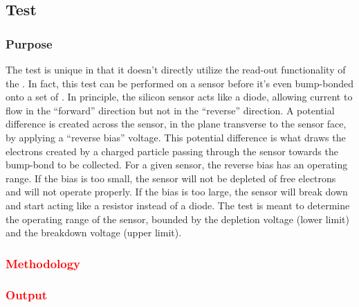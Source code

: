 
\subsection{\iv Test}
\label{ss:iv}

\subsubsection{Purpose}

The \iv test is unique in that it doesn't directly utilize the read-out functionality of the \roc.
In fact, this test can be performed on a sensor before it's even bump-bonded onto a set of \rocs.
In principle, the silicon sensor acts like a diode, 
allowing current to flow in the ``forward'' direction but not in the ``reverse'' direction.
A potential difference is created across the sensor, in the plane transverse to the sensor face,
by applying a ``reverse bias'' voltage.
This potential difference is what draws the electrons created by a charged particle passing through the sensor 
towards the bump-bond to be collected.
For a given sensor, the reverse bias has an operating range.
If the bias is too small, the sensor will not be depleted of free electrons and will not operate properly.
If the bias is too large, the sensor will break down and start acting like a resistor instead of a diode.
The \iv test is meant to determine the operating range of the sensor, 
bounded by the depletion voltage (lower limit) and the breakdown voltage (upper limit).

\subsubsection{\textcolor{red}{Methodology}}
\subsubsection{\textcolor{red}{Output}}

